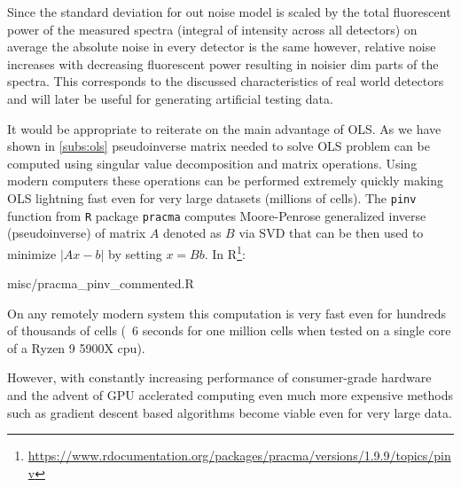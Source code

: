 Since the standard deviation for out noise model is scaled by the total fluorescent power of the measured spectra (integral of intensity across all detectors) on average the absolute noise in every detector is the same however, relative noise increases with decreasing fluorescent power resulting in noisier dim parts of the spectra. This corresponds to the discussed characteristics of real world detectors and will later be useful for generating artificial testing data.

It would be appropriate to reiterate on the main advantage of OLS. As we have shown in \cref{subs:ols} pseudoinverse matrix needed to solve OLS problem can be computed using singular value decomposition and matrix operations. Using modern computers these operations can be performed extremely quickly making OLS lightning fast even for very large datasets (millions of cells). The \texttt{pinv} function from \texttt{R} package \texttt{pracma} computes Moore-Penrose generalized inverse (pseudoinverse) of matrix $A$ denoted as $B$ via $\text{SVD}$ that can be then used to minimize $|A x - b|$ by setting $x = B b$. In R\footnote{\url{https://www.rdocumentation.org/packages/pracma/versions/1.9.9/topics/pinv}}:

\begin{listing}
\begin{lstinputlisting}[language=r]{misc/pracma_pinv_commented.R}
\end{lstinputlisting}
\caption{A commented version of \texttt{pinv} function from R library \texttt{pracma}, used to compute matrix pseudoinverses. The result can be used to perform OLS unmixing, as described in \cref{subs:ols}}
\label{lst:ex}
\end{listing}

On any remotely modern system this computation is very fast even for hundreds of thousands of cells (~6 seconds for one million cells when tested on a single core of a Ryzen 9 5900X cpu). 

However, with constantly increasing performance of consumer-grade hardware and the advent of GPU acclerated computing even much more expensive methods such as gradient descent based algorithms become viable even for very large data.

